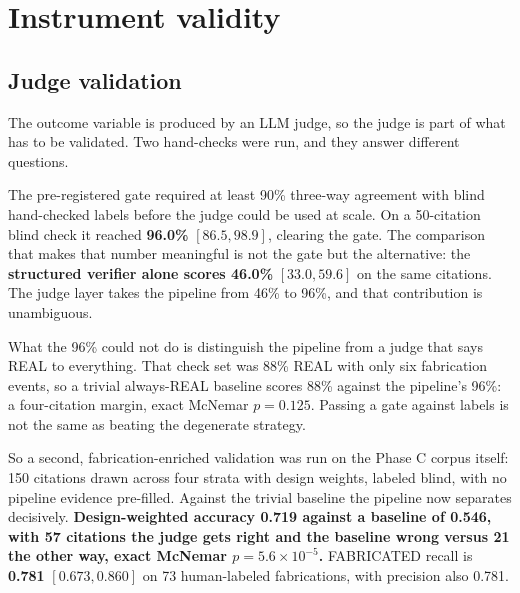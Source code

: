 %

\section{Instrument validity}
\label{sec:instrument}

\subsection{Judge validation}

The outcome variable is produced by an LLM judge, so the judge is part of what
has to be validated. Two hand-checks were run, and they answer different
questions.

The pre-registered gate required at least 90\% three-way agreement with blind
hand-checked labels before the judge could be used at scale. On a 50-citation
blind check it reached \textbf{96.0\%} $[86.5, 98.9]$, clearing the gate. The
comparison that makes that number meaningful is not the gate but the alternative:
the \textbf{structured verifier alone scores 46.0\%} $[33.0, 59.6]$ on the same
citations. The judge layer takes the pipeline from 46\% to 96\%, and that
contribution is unambiguous.

What the 96\% could not do is distinguish the pipeline from a judge that says
REAL to everything. That check set was 88\% REAL with only six fabrication
events, so a trivial always-REAL baseline scores 88\% against the pipeline's
96\%: a four-citation margin, exact McNemar $p = 0.125$. Passing a gate against
labels is not the same as beating the degenerate strategy.

So a second, fabrication-enriched validation was run on the Phase C corpus
itself: 150 citations drawn across four strata with design weights, labeled
blind, with no pipeline evidence pre-filled. Against the trivial baseline the
pipeline now separates decisively. \textbf{Design-weighted accuracy 0.719 against
a baseline of 0.546, with 57 citations the judge gets right and the baseline
wrong versus 21 the other way, exact McNemar $p = 5.6 \times 10^{-5}$.}
FABRICATED recall is \textbf{0.781} $[0.673, 0.860]$ on 73 human-labeled
fabrications, with precision also 0.781.

